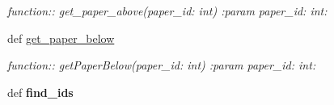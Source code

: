 \begin{DoxyCompactItemize}
\begin{DoxyCompactList}\small\item\em function\+:\+: get\+\_\+paper\+\_\+above(paper\+\_\+id\+: int) \+:param paper\+\_\+id\+: int\+: \end{DoxyCompactList}\item 
def \hyperlink{classplume-creator_1_1src_1_1plume_1_1data_1_1tree_1_1db__tree_1_1_db_tree_afdbe35e2dafd567e167e34382a79c5e7}{get\+\_\+paper\+\_\+below}\hypertarget{classplume-creator_1_1src_1_1plume_1_1data_1_1tree_1_1db__tree_1_1_db_tree_afdbe35e2dafd567e167e34382a79c5e7}{}\label{classplume-creator_1_1src_1_1plume_1_1data_1_1tree_1_1db__tree_1_1_db_tree_afdbe35e2dafd567e167e34382a79c5e7}

\begin{DoxyCompactList}\small\item\em function\+:\+: get\+Paper\+Below(paper\+\_\+id\+: int) \+:param paper\+\_\+id\+: int\+: \end{DoxyCompactList}\item 
def {\bfseries find\+\_\+ids}\hypertarget{classplume-creator_1_1src_1_1plume_1_1data_1_1tree_1_1db__tree_1_1_db_tree_a108784c41d8eec2e054af7f825a0ce9f}{}\label{classplume-creator_1_1src_1_1plume_1_1data_1_1tree_1_1db__tree_1_1_db_tree_a108784c41d8eec2e054af7f825a0ce9f}

\end{DoxyCompactItemize}
